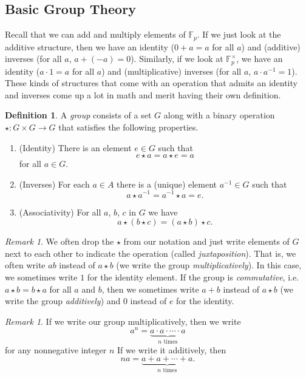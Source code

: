 \documentclass[12pt]{article}
\theoremstyle{plain}
\theoremstyle{definition}
\newtheorem{definition}[theorem]{Definition}
\theoremstyle{remark}
\newtheorem{remark}[theorem]{Remark}
\newcommand{\F}{\mathbb{F}}
\begin{document}
\subsection{Basic Group Theory}
Recall that we can add and multiply elements of $\F_p$.
If we just look at the additive structure, then we have an identity ($0 + a = a$ for all $a$) and (additive) inverses (for all $a$, $a + (-a) = 0$).
Similarly, if we look at $\F_p^\times$, we have an identity ($a\cdot 1 = a$ for all $a$) and (multiplicative) inverses (for all $a$, $a\cdot a^{-1} = 1$).
These kinds of structures that come with an operation that admits an identity and inverses come up a lot in math and merit having their own definition.

\begin{definition}
    A \emph{group} consists of a set $G$ along with a binary operation $\star: G\times G\to G$ that satisfies the following properties.
    \begin{enumerate}
        \item (Identity) There is an element $e\in G$ such that
        \[
            e \star a = a\star e = a
        \]
        for all $a\in G$.

        \item (Inverses) For each $a\in A$ there is a (unique) element $a^{-1}\in G$ such that
        \[
            a\star a^{-1} = a^{-1}\star a = e.
        \]

        \item (Associativity) For all $a$, $b$, $c$ in $G$ we have
        \[
            a\star (b\star c) = (a\star b)\star c.
        \]
    \end{enumerate}
\end{definition}

\begin{remark}
    We often drop the $\star$ from our notation and just write elements of $G$ next to each other to indicate the operation (called \emph {juxtaposition}).
    That is, we often write $ab$ instead of $a\star b$ (we write the group \emph{multiplicatively}).
    In this case, we sometimes write $1$ for the identity element.
    If the group is \emph{commutative}, i.e. $a\star b = b\star a$ for all $a$ and $b$, then we sometimes write $a+b$ instead of $a\star b$ (we write the group \emph{additively}) and 0 instead of $e$ for the identity.
\end{remark}

\begin{remark}
    If we write our group multiplicatively, then we write
    \[
        a^n = \underbrace{a\cdot a\cdot \cdots \cdot a}_{n\text{ times}}
    \]
    for any nonnegative integer $n$
    If we write it additively, then
    \[
        na = \underbrace{a + a + \cdots + a}_{n\text{ times}}.
    \]
\end{remark}
\end{document}
